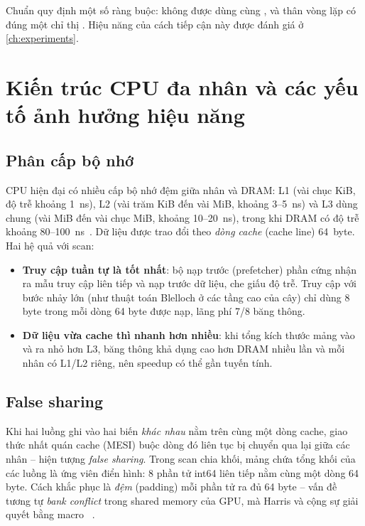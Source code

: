 Chuẩn quy định một số ràng buộc: không được dùng  cùng ,
và thân vòng lặp có đúng một chỉ thị . Hiệu năng của cách tiếp cận này được đánh giá
ở \cref{ch:experiments}.

\section{Kiến trúc CPU đa nhân và các yếu tố ảnh hưởng hiệu năng}
\label{sec:arch}

\subsection{Phân cấp bộ nhớ}

CPU hiện đại có nhiều cấp bộ nhớ đệm giữa nhân và DRAM: L1 (vài chục KiB, độ trễ khoảng 1~ns),
L2 (vài trăm KiB đến vài MiB, khoảng 3--5~ns) và L3 dùng chung (vài MiB đến vài chục MiB,
khoảng 10--20~ns), trong khi DRAM có độ trễ khoảng 80--100~ns~\cite{hennessy2019}. Dữ liệu
được trao đổi theo \emph{dòng cache} (cache line) 64~byte. Hai hệ quả với scan:
\begin{itemize}
  \item \textbf{Truy cập tuần tự là tốt nhất}: bộ nạp trước (prefetcher) phần cứng nhận ra mẫu
        truy cập liên tiếp và nạp trước dữ liệu, che giấu độ trễ. Truy cập với bước nhảy lớn
        (như thuật toán Blelloch ở các tầng cao của cây) chỉ dùng 8 byte trong mỗi dòng 64 byte
        được nạp, lãng phí 7/8 băng thông.
  \item \textbf{Dữ liệu vừa cache thì nhanh hơn nhiều}: khi tổng kích thước mảng vào và ra nhỏ
        hơn L3, băng thông khả dụng cao hơn DRAM nhiều lần và mỗi nhân có L1/L2 riêng, nên
        speedup có thể gần tuyến tính.
\end{itemize}

\subsection{False sharing}

Khi hai luồng ghi vào hai biến \emph{khác nhau} nằm trên cùng một dòng cache, giao thức nhất
quán cache (MESI) buộc dòng đó liên tục bị chuyển qua lại giữa các nhân -- hiện tượng
\emph{false sharing}. Trong scan chia khối, mảng  chứa tổng khối của các luồng là
ứng viên điển hình: 8 phần tử int64 liên tiếp nằm cùng một dòng 64 byte. Cách khắc phục là
\emph{đệm} (padding) mỗi phần tử ra đủ 64 byte -- vấn đề tương tự \emph{bank conflict} trong
shared memory của GPU, mà Harris và cộng sự giải quyết bằng macro
~\cite{harris2007}.

